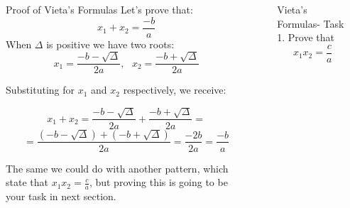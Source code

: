\documentclass[final]{beamer}
\newlength{\sepwid}
\newlength{\onecolwid}
\newlength{\twocolwid}
\begin{document}
\begin{frame}[t]
\begin{columns}[t]
\begin{column}{\twocolwid}
\begin{columns}[t,totalwidth=\twocolwid]
\begin{column}{\onecolwid}

\end{column} %

\begin{column}{\onecolwid} %


\begin{block}{ Proof of Vieta's Formulas}
Let's prove that:
$$x_1 + x_2 = \frac{-b}{a}$$
When $\Delta$ is positive we have two roots:
$$x_1 = \frac{-b-\sqrt{\Delta}}{2a},\ \ \ x_2 = \frac{-b+\sqrt{\Delta}}{2a}$$

Substituting for $x_1$ and $x_2$ respectively, we receive:
					
$$x_1 + x_2 = \frac{-b-\sqrt{\Delta}}{2a} + \frac{-b+\sqrt{\Delta}}{2a} =$$
$$ = \frac{(-b-\sqrt{\Delta}) + (-b+\sqrt{\Delta})}{2a} = \frac{-2b}{2a} = \frac{-b}{a}$$
                    
The same we could do with another pattern, which state that $x_1 x_2 = \frac{c}{a}$, but proving this is going to be your task in next section.

\end{block}


\end{column} %

\end{columns} %

\end{column} %

\begin{column}{\sepwid}\end{column} %

\begin{column}{\onecolwid} %


\begin{block}{Vieta's Formulas- Task}
1. Prove that $$x_1x_2 = \frac{c}{a}$$
\[\]
\[\]
\[\]
\[\]
\[\]


\end{block}
\end{column}
\end{columns}
\end{frame}
\end{document}
